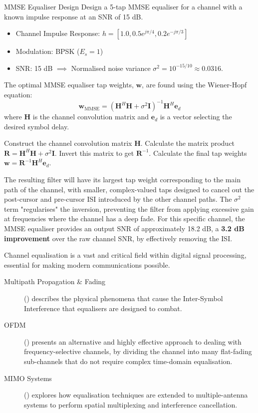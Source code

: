 \begin{workedexample}{MMSE Equaliser Design}
     Design a 5-tap MMSE equaliser for a channel with a known impulse response at an SNR of 15 dB.
    \begin{itemize}
        \item Channel Impulse Response: $h = [1.0, 0.5e^{j\pi/4}, 0.2e^{-j\pi/3}]$
        \item Modulation: BPSK ($E_s=1$)
        \item SNR: 15 dB $\implies$ Normalised noise variance $\sigma^2 = 10^{-15/10} \approx 0.0316$.
    \end{itemize}
    The optimal MMSE equaliser tap weights, $\mathbf{w}$, are found using the Wiener-Hopf equation:
    \[ \mathbf{w}_{\text{MMSE}} = (\mathbf{H}^H \mathbf{H} + \sigma^2 \mathbf{I})^{-1} \mathbf{H}^H \mathbf{e}_d \]
    where $\mathbf{H}$ is the channel convolution matrix and $\mathbf{e}_d$ is a vector selecting the desired symbol delay.
    \begin{derivationsteps}
        \step Construct the channel convolution matrix $\mathbf{H}$.
        \step Calculate the matrix product $\mathbf{R} = \mathbf{H}^H \mathbf{H} + \sigma^2 \mathbf{I}$.
        \step Invert this matrix to get $\mathbf{R}^{-1}$.
        \step Calculate the final tap weights $\mathbf{w} = \mathbf{R}^{-1} \mathbf{H}^H \mathbf{e}_d$.
    \end{derivationsteps}
     The resulting filter will have its largest tap weight corresponding to the main path of the channel, with smaller, complex-valued taps designed to cancel out the post-cursor and pre-cursor ISI introduced by the other channel paths. The $\sigma^2$ term "regularises" the inversion, preventing the filter from applying excessive gain at frequencies where the channel has a deep fade. For this specific channel, the MMSE equaliser provides an output SNR of approximately 18.2 dB, a \textbf{3.2 dB improvement} over the raw channel SNR, by effectively removing the ISI.
\end{workedexample}

\begin{importantbox}[title={Further Reading}]
    Channel equalisation is a vast and critical field within digital signal processing, essential for making modern communications possible.
    \begin{description}
        \item[Multipath Propagation \& Fading] () describes the physical phenomena that cause the Inter-Symbol Interference that equalisers are designed to combat.
        \item[OFDM] () presents an alternative and highly effective approach to dealing with frequency-selective channels, by dividing the channel into many flat-fading sub-channels that do not require complex time-domain equalisation.
        \item[MIMO Systems] () explores how equalisation techniques are extended to multiple-antenna systems to perform spatial multiplexing and interference cancellation.
    \end{description}
\end{importantbox}